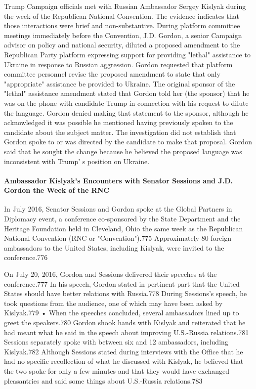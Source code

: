 Trump Campaign officials met with Russian Ambassador Sergey Kislyak during the week of the Republican National Convention.  The evidence indicates that those interactions were brief and non-substantive. During platform committee meetings immediately before the Convention, J.D. Gordon, a  senior Campaign advisor on policy and national security, diluted a  proposed amendment to the Republican Party platform expressing support for providing "lethal" assistance to Ukraine in response to Russian aggression. Gordon requested that platform committee personnel revise the proposed amendment to state that only "appropriate" assistance be provided to Ukraine. The original sponsor of the "lethal" assistance amendment stated that Gordon told her (the sponsor) that he was on the phone with candidate Trump in connection with his request to dilute the language. Gordon denied making that statement to the sponsor, although he acknowledged it was possible he mentioned having previously spoken to the candidate about the subject matter. The investigation did not establish that Gordon spoke to or was directed by the candidate to make that proposal. Gordon said that he sought the change because he believed the proposed language was inconsistent with Trump' s position on Ukraine.

\paragraph{Ambassador Kislyak's Encounters with Senator Sessions and J.D. Gordon the Week of the RNC}

In July 2016, Senator Sessions and Gordon spoke at the Global Partners in Diplomacy event,  a  conference co-sponsored by the State Department and the Heritage Foundation held in Cleveland, Ohio the same week as the Republican National Convention (RNC or "Convention").775 Approximately 80 foreign ambassadors to the United States, including Kislyak, were invited to the conference.776

On July 20, 2016, Gordon and Sessions delivered their speeches at the conference.777 In his speech, Gordon stated in pertinent part that the United States should have better relations with Russia.778 During Sessions's speech, he took questions from the audience, one of which may have been asked by Kislyak.779 • When the speeches concluded,  several ambassadors lined up to greet the speakers.780 Gordon shook hands with Kislyak and reiterated that he had meant what he said in the speech about improving U.S.-Russia relations.781 Sessions separately spoke with between six and 12 ambassadors, including Kislyak.782 Although Sessions stated during interviews with the Office that he had no specific recollection of what he discussed with Kislyak, he believed that the two spoke for only a  few minutes and that they would have exchanged pleasantries and said some things about U.S.-Russia relations.783

